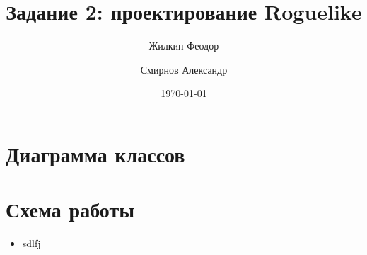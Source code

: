 \documentclass[a4paper,10pt]{article}
\title{Задание 2: проектирование Roguelike}
\author{
	Жилкин Феодор\\
	\and
	Смирнов Александр
}
\date{\today}
\begin{document}
\maketitle

\section*{Диаграмма классов}

\newpage

\section*{Схема работы}

\begin{itemize}
	\item sdlfj
\end{itemize}
\end{document}
